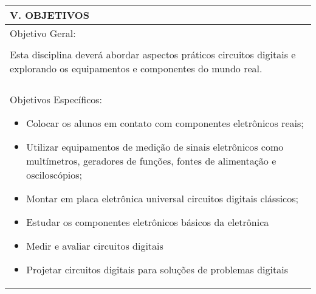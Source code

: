 \documentclass[12pt]{article}
\begin{document}
\begin{longtable}{|L{1.025\textwidth}|} \hline
%
{\bf V. OBJETIVOS } \\ \hline
Objetivo Geral: \\
\\
Esta disciplina deverá abordar aspectos práticos circuitos digitais e explorando os equipamentos e componentes do mundo real.\\
\\
Objetivos Específicos:
\begin{itemize}
\item Colocar os alunos em contato com componentes eletrônicos reais;
\item Utilizar equipamentos de medição de sinais eletrônicos como multímetros, geradores de funções, fontes de alimentação e osciloscópios;
\item Montar em placa eletrônica universal circuitos digitais clássicos;
\item Estudar os componentes eletrônicos básicos da eletrônica
\item Medir e avaliar circuitos digitais
\item Projetar circuitos digitais para soluções de problemas digitais
\end{itemize}
\\ \hline
\end{longtable}
\end{document}
